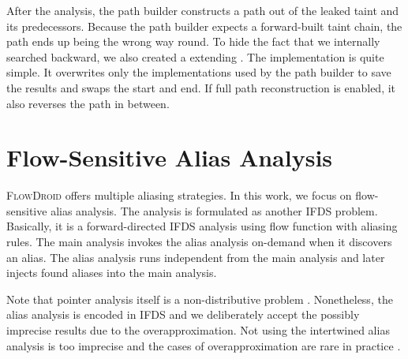 \documentclass[../draft.tex]{subfiles}
\begin{document}
    After the analysis, the path builder constructs a path out of the leaked taint and its predecessors.
    Because the path builder expects a forward-built taint chain, the path ends up being the wrong way round.
    To hide the fact that we internally searched backward, we also created a  extending .
    The implementation is quite simple.
    It overwrites only the  implementations used by the path builder to save the results and swaps the start and end.
    If full path reconstruction is enabled, it also reverses the path in between.

    \section{Flow-Sensitive Alias Analysis}\label{s:aliasing}
    \textsc{FlowDroid} offers multiple aliasing strategies.
    In this work, we focus on flow-sensitive alias analysis.
    The analysis is formulated as another IFDS problem.
    Basically, it is a forward-directed IFDS analysis using flow function with aliasing rules.
    The main analysis invokes the alias analysis on-demand when it discovers an alias.
    The alias analysis runs independent from the main analysis and later injects found aliases into the main analysis.

    Note that pointer analysis itself is a non-distributive problem \cite{Arzt2017PhD, Spaeth2016}.
    Nonetheless, the alias analysis is encoded in IFDS and we deliberately accept the possibly imprecise results due to the overapproximation.
    Not using the intertwined alias analysis is too imprecise and the cases of overapproximation are rare in practice \cite{Arzt2017PhD}.
\end{document}
